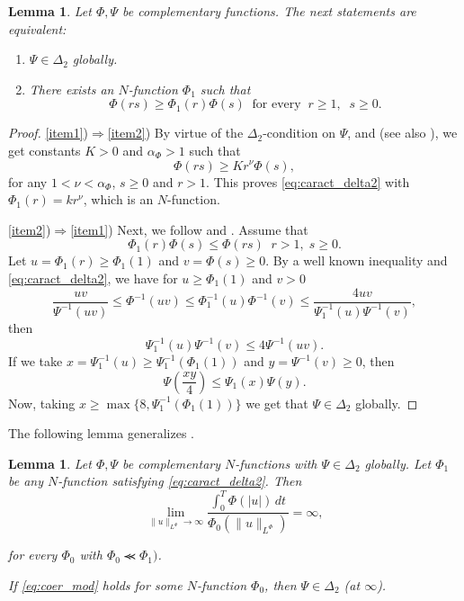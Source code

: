 \documentclass[twoside]{article}
\newtheorem{lem}[thm]{Lemma}
\theoremstyle{remark}
\newcommand{\orlnor}{\|_{L^{\Phi}}}
\renewcommand{\leq}{\leqslant}
\renewcommand{\geq}{\geqslant}
\begin{document}
\begin{lem}\label{lem:submultipliativa}
Let $\Phi,\Psi$ be complementary functions.
The next statements are equivalent:
\begin{enumerate}
\item\label{item1} $\Psi \in \Delta_2$ globally.
\item\label{item2} There exists an $N$-function $\Phi_1$ such that
\begin{equation}\label{eq:caract_delta2}
\Phi(rs)\geq \Phi_1(r)\Phi(s)\;\;\mbox{for every}\;\;r\geq1,\;\;s\geq 0.
\end{equation}
\end{enumerate}
\end{lem}

\begin{proof}
\ref{item1})$\Rightarrow$\ref{item2})
By virtue of the $\Delta_2$-condition on $\Psi$, \cite[Thm. 11.7]{M} and \cite[Cor. 11.6]{M} (see also  \cite[Eq. (2.8)]{AGMS}), we get constants $K>0$ and $\alpha_{\Phi}>1$ such that
\begin{equation}\label{delta2-consecuencia}
\Phi(r s)\geq Kr^{\nu}\Phi(s),
\end{equation}
for any $1<\nu<\alpha_{\Phi}$,  $s\geq 0$ and $r>1$. This proves  \eqref{eq:caract_delta2} with $\Phi_1(r)=kr^\nu$, which is an $N$-function.

\ref{item2})$\Rightarrow$\ref{item1})
Next, we follow  \cite[p. 32, Prop. 13]{rao1991theory} and \cite[p. 29, Prop. 9]{rao1991theory}.
Assume that 
\[
\Phi_1(r)\Phi(s)\leq \Phi(rs)\;\;r>1,\;s\geq 0.
\]
Let $u=\Phi_1(r)\geq \Phi_1(1)$ and $v=\Phi(s)\geq 0$. By a well known inequality \cite[p. 13, Prop. 1]{rao1991theory} and \eqref{eq:caract_delta2},  we have  for $u\geq \Phi_1(1)$ and $v> 0$
\[
\frac{uv}{\Psi^{-1}(uv)}\leq \Phi^{-1}(uv)\leq\Phi_1^{-1}(u)\Phi^{-1}(v)\leq
\frac{4uv}{\Psi_1^{-1}(u)\Psi^{-1}(v)},
\]
then 
\[
\Psi^{-1}_1(u)\Psi^{-1}(v)\leq 4 \Psi^{-1}(uv).
\]
If we take $x=\Psi^{-1}_1(u)\geq \Psi^{-1}_1(\Phi_1(1))$ and $y=\Psi^{-1}(v)\geq 0$, then 
\[
\Psi\left(\frac{xy}{4}\right)\leq \Psi_1(x)\Psi(y).
\]
Now, taking  $x\geq \max\{8,\Psi_1^{-1}(\Phi_1(1))\}$ we get that $\Psi \in \Delta_2$ globally.
\end{proof}

The following lemma generalizes \cite[Lemma 5.2]{ABGMS2015}.

\begin{lem}\label{lem_coer}
Let $\Phi,\Psi$ be complementary $N$-functions with $\Psi \in \Delta_2$ globally. Let $\Phi_1$ be any $N$-function satisfying \eqref{eq:caract_delta2}. Then
\begin{equation}\label{eq:coer_mod}
\lim\limits_{\|u\orlnor\to \infty}
\frac{\int_0^T \Phi(|u|)\,dt}{\Phi_0(\|u\orlnor)}=\infty,
\end{equation}


for every $\Phi_0$ with $\Phi_0\llcurly\Phi_1)$.

If  \eqref{eq:coer_mod} holds for some $N$-function $\Phi_0$,  then $\Psi\in\Delta_2$ (at $\infty$).
\end{lem}
\end{document}
